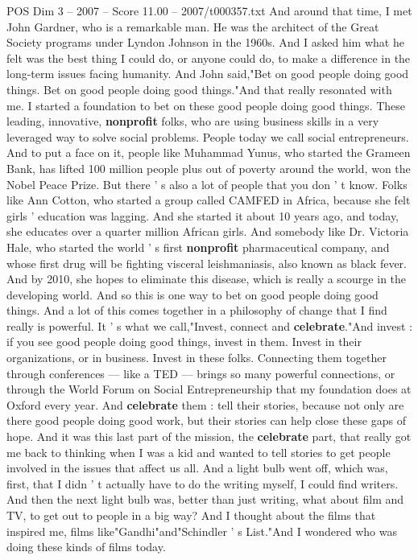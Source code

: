 \begin{textsample}{POS Dim 3 – 2007 – Score 11.00 – 2007/t000357.txt}
And around that time, I met John Gardner, who is a remarkable man.
He was the architect of the Great Society programs under Lyndon Johnson in the 1960s.
And I asked him what he felt was the best thing I could do, or anyone could do, to make a difference in the long-term issues facing humanity.
And John said,"Bet on good people doing good things.
Bet on good people doing good things."And that really resonated with me.
I started a foundation to bet on these good people doing good things.
These leading, innovative, \textbf{nonprofit} folks, who are using business skills in a very leveraged way to solve social problems.
People today we call social entrepreneurs.
And to put a face on it, people like Muhammad Yunus, who started the Grameen Bank, has lifted 100 million people plus out of poverty around the world, won the Nobel Peace Prize.
But there ' s also a lot of people that you don ' t know.
Folks like Ann Cotton, who started a group called CAMFED in Africa, because she felt girls ' education was lagging.
And she started it about 10 years ago, and today, she educates over a quarter million African girls.
And somebody like Dr.
Victoria Hale, who started the world ' s first \textbf{nonprofit} pharmaceutical company, and whose first drug will be fighting visceral leishmaniasis, also known as black fever.
And by 2010, she hopes to eliminate this disease, which is really a scourge in the developing world.
And so this is one way to bet on good people doing good things.
And a lot of this comes together in a philosophy of change that I find really is powerful.
It ' s what we call,"Invest, connect and \textbf{celebrate}."And invest : if you see good people doing good things, invest in them.
Invest in their organizations, or in business.
Invest in these folks.
Connecting them together through conferences — like a TED — brings so many powerful connections, or through the World Forum on Social Entrepreneurship that my foundation does at Oxford every year.
And \textbf{celebrate} them : tell their stories, because not only are there good people doing good work, but their stories can help close these gaps of hope.
And it was this last part of the mission, the \textbf{celebrate} part, that really got me back to thinking when I was a kid and wanted to tell stories to get people involved in the issues that affect us all.
And a light bulb went off, which was, first, that I didn ' t actually have to do the writing myself, I could find writers.
And then the next light bulb was, better than just writing, what about film and TV, to get out to people in a big way?
And I thought about the films that inspired me, films like"Gandhi"and"Schindler ' s List."And I wondered who was doing these kinds of films today.

\end{textsample}
